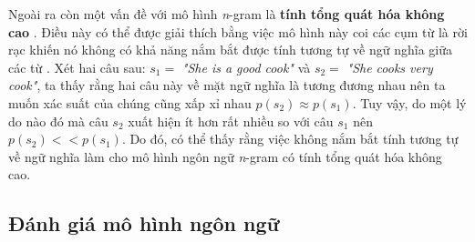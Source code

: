 Ngoài ra còn một vấn đề với mô hình \textit{n}-gram là \textbf{tính tổng quát hóa không cao} \cite{bengioLM2003}. Điều này có thể được giải thích bằng việc mô hình này coi các cụm từ là rời rạc khiến nó không có khả năng nắm bắt được tính tương tự về ngữ nghĩa giữa các từ \cite{bengioLM2003}. Xét hai câu sau: $s_1 =$ \textit{"She is a good cook"} và $s_2 =$ \textit{"She cooks very cook"}, ta thấy rằng hai câu này về mặt ngữ nghĩa là tương đương nhau nên ta muốn xác suất của chúng cũng xấp xỉ nhau $p(s_2) \approx p(s_1)$. Tuy vậy, do một lý do nào đó mà câu $s_2$ xuất hiện ít hơn rất nhiều so với câu $s_1$ nên $p(s_2) << p(s_1)$. Do đó, có thể thấy rằng việc không nắm bắt tính tương tự về ngữ nghĩa làm cho mô hình ngôn ngữ \textit{n}-gram có tính tổng quát hóa không cao.




\subsection{Đánh giá mô hình ngôn ngữ}

